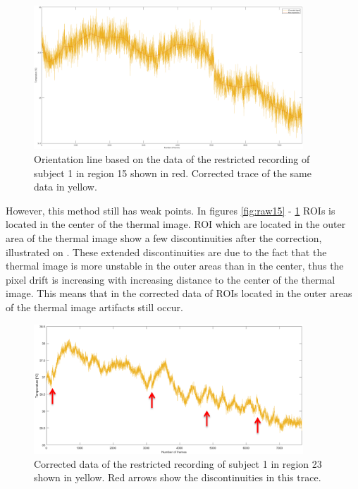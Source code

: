 \begin{figure}[H]
	\includegraphics[width=0.9\textwidth]{figures/corr15}
	\caption{Orientation line based on the data of the restricted recording of subject 1 in region 15 shown in red. Corrected trace of the same data in yellow.}
	\label{fig:corr15}
\end{figure}
However, this method still has weak points. In figures \ref{fig:raw15} - \ref{fig:corr15} ROIs is located in the center of the thermal image. ROI which are located in the outer area of the thermal image show a few discontinuities after the correction, illustrated on . These extended discontinuities are due to the fact that the thermal image is more unstable in the outer areas than in the center, thus the pixel drift is increasing with increasing distance to the center of the thermal image\cite{olbrycht2015}. This means that in the corrected data of ROIs located in the outer areas of the thermal image artifacts still occur. 
\begin{figure}[H]
	\includegraphics[width=0.9\textwidth]{figures/corr23pfeile}
	\caption{Corrected data of the restricted recording of subject 1 in region 23 shown in yellow. Red arrows show the discontinuities in this trace.}
	\label{fig:corr23}
\end{figure}